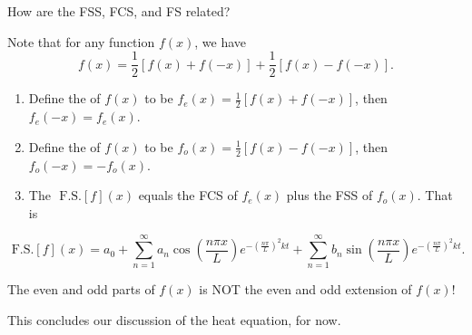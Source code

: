 \documentclass[class=article,crop=false]{standalone}
\begin{document}
How are the FSS, FCS, and FS related?
\begin{defn}[]
	Note that for any function $ f(x)$, we have
	 \[
		 f(x)=\frac{1}{2}[f(x) + f(-x)] + \frac{1}{2} [f(x)- f(-x)]
	.\] 
\begin{enumerate}[label=\arabic*)]
\item Define the  of $ f(x)$ to be  $ f_e(x) = \frac{1}{2} [f(x)+f(-x)]$, then $ f_e(-x)=f_e(x)$.
\item Define the   of $ f(x)$ to be  $ f_o(x) = \frac{1}{2} [f(x) - f(-x)]$, then $ f_o(-x) = - f_o(x)$.
\item The  $ \text{ F.S.} [ f]( x) $ equals the FCS of $ f_e(x)$ plus the FSS of  $ f_o(x)$. That is
\end{enumerate}
 \[
\text{ F.S.} [ f]( x) = a_0 + \sum_{ n= 1}^{\infty} a_n \cos \left( \frac{ n\pi x}{ L} \right) e^{-( \frac{ n\pi}{L} )^2 kt} + \sum_{ n= 1}^{\infty} b_n \sin \left( \frac{ n\pi x}{ L} \right) e^{-( \frac{ n\pi}{L} )^2 kt} 
.\] 
\end{defn}
\begin{note}[]
	The even and odd parts of $ f(x)$ is NOT the even and odd extension of  $ f(x)$!
\end{note}

This concludes our discussion of the heat equation, for now.
\end{document}
